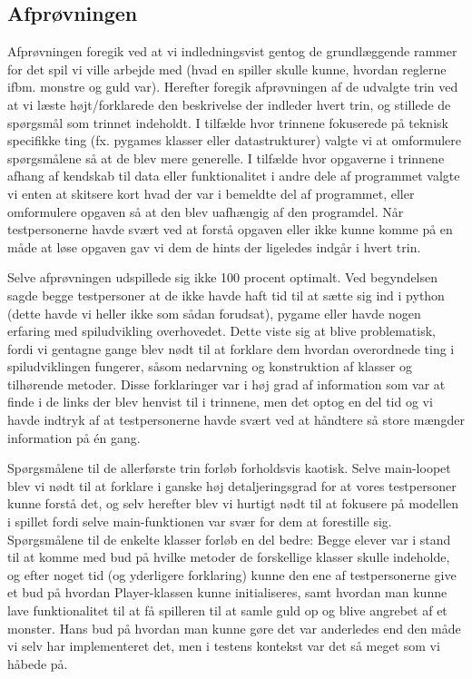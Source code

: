 \documentclass[10pt,a4paper,danish]{article}
\begin{document}
\subsection{Afprøvningen}
Afprøvningen foregik ved at vi indledningsvist gentog de grundlæggende rammer for det
spil vi ville arbejde med (hvad en spiller skulle kunne, 
hvordan reglerne ifbm. monstre og guld var). Herefter foregik afprøvningen af de
udvalgte trin ved at vi læste højt/forklarede den beskrivelse der indleder hvert 
trin, og stillede de spørgsmål som trinnet indeholdt. I tilfælde hvor trinnene
fokuserede på teknisk specifikke ting (fx. pygames klasser eller datastrukturer) 
valgte vi at omformulere spørgsmålene så at de blev mere generelle. I tilfælde hvor 
opgaverne i trinnene afhang af kendskab til data eller funktionalitet i andre dele 
af programmet valgte vi enten at skitsere kort hvad der var i bemeldte del af programmet, 
eller omformulere opgaven så at den blev uafhængig af den programdel. Når testpersonerne havde
svært ved at forstå opgaven eller ikke kunne komme på en måde at løse opgaven
gav vi dem de hints der ligeledes indgår i hvert trin. 

Selve afprøvningen udspillede sig ikke 100 procent optimalt. Ved begyndelsen sagde
begge testpersoner at de ikke havde haft tid til at sætte sig 
ind i python (dette havde vi heller ikke som sådan forudsat), pygame eller havde nogen 
erfaring med spiludvikling overhovedet. Dette viste sig at blive problematisk, fordi 
vi gentagne gange blev nødt til at forklare dem hvordan overordnede ting i spiludviklingen
fungerer, såsom nedarvning og konstruktion af klasser og tilhørende metoder. Disse forklaringer
var i høj grad af information som var at finde i de links der blev henvist til i trinnene, 
men det optog en del tid og vi havde indtryk af at testpersonerne havde svært ved at 
håndtere så store mængder information på én gang. 

Spørgsmålene til de allerførste trin forløb forholdsvis kaotisk. Selve main-loopet
blev vi nødt til at forklare i ganske høj detaljeringsgrad for at vores testpersoner
kunne forstå det, og selv herefter blev vi hurtigt nødt til at fokusere på modellen
i spillet fordi selve main-funktionen var svær for dem at forestille sig. Spørgsmålene
til de enkelte klasser forløb en del bedre: Begge elever var i stand til at komme med 
bud på hvilke metoder de forskellige klasser skulle indeholde, og efter noget tid (og
yderligere forklaring) kunne den ene af testpersonerne give et bud på hvordan Player-klassen
kunne initialiseres, samt hvordan man kunne lave funktionalitet til at få spilleren 
til at samle guld op og blive angrebet af et monster. Hans bud på hvordan man kunne gøre 
det var anderledes end den måde vi selv har implementeret det, men i testens kontekst
var det så meget som vi håbede på.
\end{document}
